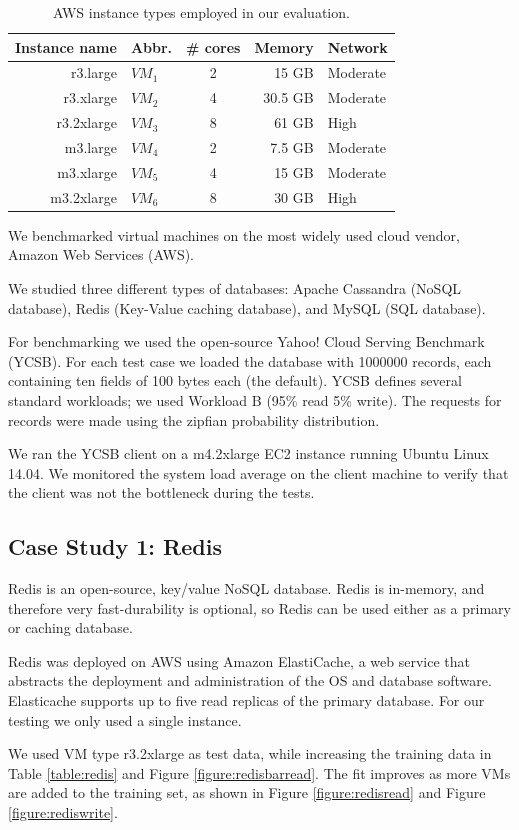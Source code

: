 \documentclass{acm_proc_article-sp}
\newcommand{\mm}[1]{{\color{red}#1}}
\begin{document}
\begin{table}
\centering

\begin{tabular}{|r|l|c|r|l|} \hline
Instance name & Abbr.& \# cores&Memory&Network\\ \hline
r3.large & $VM_1$ & 2 & 15 GB & Moderate\\ \hline
r3.xlarge & $VM_2$ & 4 & 30.5 GB & Moderate\\ \hline
r3.2xlarge & $VM_3$ & 8 & 61 GB & High\\ \hline
m3.large & $VM_4$ & 2 & 7.5 GB & Moderate\\ \hline
m3.xlarge & $VM_5$ & 4 & 15 GB & Moderate\\ \hline
m3.2xlarge & $VM_6$ & 8 & 30 GB & High\\ \hline
\hline\end{tabular}
\caption{AWS instance types employed in our evaluation. }
\label{table:awstypes}
\end{table}


\mm{
We benchmarked virtual machines on the most widely used cloud vendor, Amazon Web Services (AWS).

We studied three different types of databases: Apache Cassandra (NoSQL database), Redis (Key-Value caching database), and MySQL (SQL database).

For benchmarking we used the open-source Yahoo! Cloud Serving Benchmark (YCSB).  For each test case we loaded the database with 1000000 records, each containing ten fields of 100 bytes each (the default).  YCSB defines several standard workloads; we used Workload B (95\% read 5\% write).  The requests for records were made using the zipfian probability distribution.

We ran the YCSB client on a m4.2xlarge EC2 instance running Ubuntu Linux 14.04. We monitored the system load average on the client machine to verify that the client was not the bottleneck during the tests.
}

\subsection{Case Study 1: Redis}
\vspace{10pt}

\mm{
Redis is an open-source, key/value NoSQL database.  Redis is in-memory, and therefore very fast-durability is optional, so Redis can be used either as a primary or caching database.

Redis was deployed on AWS using Amazon ElastiCache, a web service that abstracts the deployment and administration of the OS and database software.  Elasticache supports up to five read replicas of the primary database.  For our testing we only used a single instance.

We used VM type r3.2xlarge as test data, while increasing the training data in Table \ref{table:redis} and Figure \ref{figure:redisbarread}.  The fit improves as more VMs are added to the training set, as shown in Figure \ref{figure:redisread} and Figure \ref{figure:rediswrite}.
}
\end{document}
